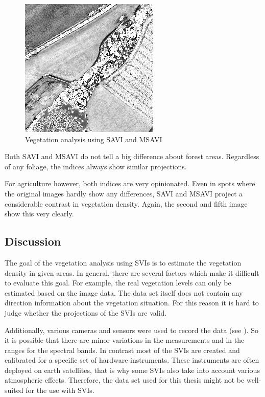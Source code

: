 \begin{figure}
    \includegraphics[width=\VegetationIndicesImageWidth]{images/vegetation/msavi/5}

    \caption{Vegetation analysis using SAVI and MSAVI}
    \label{fig:vegetation_savi_examples}
\end{figure}

Both SAVI and MSAVI do not tell a big difference about forest areas. Regardless of any foliage, the indices always show similar projections.

For agriculture however, both indices are very opinionated. Even in spots where the original images hardly show any differences, SAVI and MSAVI project a considerable contrast in vegetation density. Again, the second and fifth image show this very clearly.

\subsection{Discussion}
The goal of the vegetation analysis using SVIs is to estimate the vegetation density in given areas. In general, there are several factors which make it difficult to evaluate this goal. For example, the real vegetation levels can only be estimated based on the image data. The data set itself does not contain any direction information about the vegetation situation. For this reason it is hard to judge whether the projections of the SVIs are valid.

Additionally, various cameras and sensors were used to record the data (see ). So it is possible that there are minor variations in the measurements and in the ranges for the spectral bands. In contrast most of the SVIs are created and calibrated for a specific set of hardware instruments. These instruments are often deployed on earth satellites, that is why some SVIs also take into account various atmospheric effects. Therefore, the data set used for this thesis might not be well-suited for the use with SVIs.

